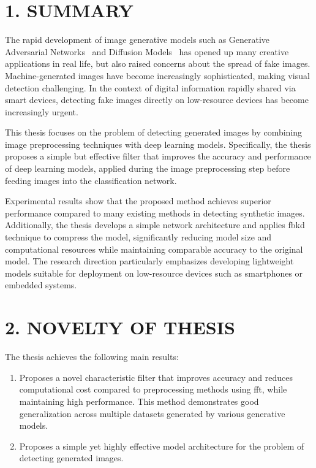 \section*{1. SUMMARY}
%
The rapid development of image generative models such as Generative Adversarial Networks~\cite{Goodfellow2014GenerativeAN} and Diffusion Models~\cite{Ho2020DenoisingDP} has opened up many creative applications in real life, but also raised concerns about the spread of fake images. Machine-generated images have become increasingly sophisticated, making visual detection challenging. In the context of digital information rapidly shared via smart devices, detecting fake images directly on low-resource devices has become increasingly urgent.

This thesis focuses on the problem of detecting generated images by combining image preprocessing techniques with deep learning models. Specifically, the thesis proposes a simple but effective filter that improves the accuracy and performance of deep learning models, applied during the image preprocessing step before feeding images into the classification network.

Experimental results show that the proposed method achieves superior performance compared to many existing methods in detecting synthetic images. Additionally, the thesis develops a simple network architecture and applies \gls{fbkd} technique to compress the model, significantly reducing model size and computational resources while maintaining comparable accuracy to the original model. The research direction particularly emphasizes developing lightweight models suitable for deployment on low-resource devices such as smartphones or embedded systems.
%
%
%
\section*{2. NOVELTY OF THESIS}
The thesis achieves the following main results:

\begin{enumerate}
	\item Proposes a novel characteristic filter that improves accuracy and reduces computational cost compared to preprocessing methods using \gls{fft}, while maintaining high performance. This method demonstrates good generalization across multiple datasets generated by various generative models.
	
	\item Proposes a simple yet highly effective model architecture for the problem of detecting generated images.
	
	
\end{enumerate}

